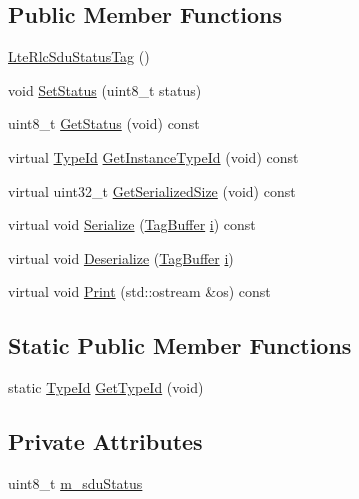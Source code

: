 \subsection*{Public Member Functions}
\begin{DoxyCompactItemize}
\item 
\hyperlink{classns3_1_1LteRlcSduStatusTag_a16c57add4b8ad1c910738b07b0dfe595}{Lte\+Rlc\+Sdu\+Status\+Tag} ()
\item 
void \hyperlink{classns3_1_1LteRlcSduStatusTag_ae9cec7a6318fc639082c763bf5b01a32}{Set\+Status} (uint8\+\_\+t status)
\item 
uint8\+\_\+t \hyperlink{classns3_1_1LteRlcSduStatusTag_a2c3ce7a93babb2678691c4700386f5b5}{Get\+Status} (void) const 
\item 
virtual \hyperlink{classns3_1_1TypeId}{Type\+Id} \hyperlink{classns3_1_1LteRlcSduStatusTag_a8910bef6ee772313f249c1e57d86ac68}{Get\+Instance\+Type\+Id} (void) const 
\item 
virtual uint32\+\_\+t \hyperlink{classns3_1_1LteRlcSduStatusTag_a439dbb956115b86a7ff6cd029852e3f9}{Get\+Serialized\+Size} (void) const 
\item 
virtual void \hyperlink{classns3_1_1LteRlcSduStatusTag_a9835f64e38fa949b0f66f7270abc41f7}{Serialize} (\hyperlink{classns3_1_1TagBuffer}{Tag\+Buffer} \hyperlink{lte__uplink__power__control_8m_a6f6ccfcf58b31cb6412107d9d5281426}{i}) const 
\item 
virtual void \hyperlink{classns3_1_1LteRlcSduStatusTag_a82c4718b69f72c4562a81aa09295012e}{Deserialize} (\hyperlink{classns3_1_1TagBuffer}{Tag\+Buffer} \hyperlink{lte__uplink__power__control_8m_a6f6ccfcf58b31cb6412107d9d5281426}{i})
\item 
virtual void \hyperlink{classns3_1_1LteRlcSduStatusTag_aac01b3461a662d28f581608081860e60}{Print} (std\+::ostream \&os) const 
\end{DoxyCompactItemize}
\subsection*{Static Public Member Functions}
\begin{DoxyCompactItemize}
\item 
static \hyperlink{classns3_1_1TypeId}{Type\+Id} \hyperlink{classns3_1_1LteRlcSduStatusTag_a35758cb68704cee383f62bb8b9d9ebde}{Get\+Type\+Id} (void)
\end{DoxyCompactItemize}
\subsection*{Private Attributes}
\begin{DoxyCompactItemize}
\item 
uint8\+\_\+t \hyperlink{classns3_1_1LteRlcSduStatusTag_a64cf64a7d8be515a36af4be96881e1d9}{m\+\_\+sdu\+Status}
\end{DoxyCompactItemize}
